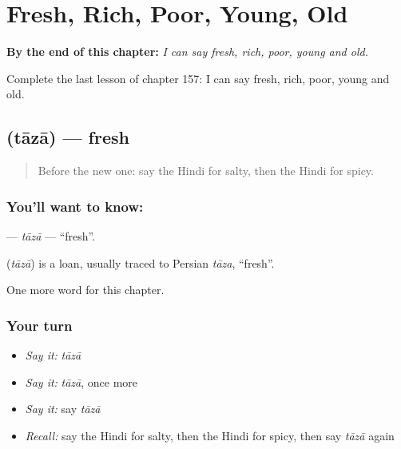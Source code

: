 
\chapter{Fresh, Rich, Poor, Young, Old}
\label{ch:hi-fresh-rich-poor-young-old}

\begin{chapteropening}
\textbf{By the end of this chapter:} \emph{I can say fresh, rich, poor, young and old.}

Complete the last lesson of chapter 157: I can say fresh, rich, poor, young and old.
\end{chapteropening}

\section[\texorpdfstring{\hi{ताज़ा} (tāzā)}{ताज़ा (tāzā)}]{ (tāzā) — fresh}

\label{lesson:HI-C157-taza}



\begin{quote}
Before the new one: say the Hindi for salty, then the Hindi for spicy.
\end{quote}

\subsection*{You'll want to know: }
\textbf{} — \emph{tāzā} — \textquotedblleft{}fresh\textquotedblright{}.

\begin{cousinweb}
\textbf{} (\emph{tāzā}) is a loan, usually traced to Persian \emph{tāza}, \textquotedblleft{}fresh\textquotedblright{}.
\end{cousinweb}

\begin{grammarlens}[title={What you've built}]
One more word for this chapter.
\end{grammarlens}

\subsection*{Your turn}
\begin{itemize}
\raggedright
  \item \emph{Say it:} \emph{tāzā}
  \item \emph{Say it:} \emph{tāzā}, once more
  \item \emph{Say it:} say \emph{tāzā}
  \item \emph{Recall:} say the Hindi for salty, then the Hindi for spicy, then say \emph{tāzā} again
\end{itemize}

